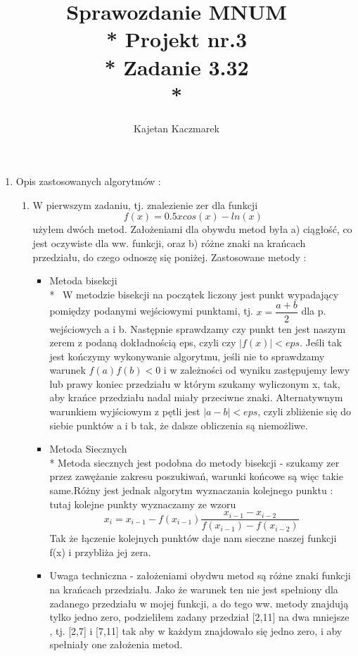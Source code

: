 \documentclass[a4paper, 11pt]{article}
\author{Kajetan Kaczmarek}
\begin{document}
\title{Sprawozdanie MNUM \\* Projekt nr.3 \\* 
Zadanie 3.32 \\*}
\maketitle

\begin{enumerate}

\item Opis zastosowanych algorytmów : 
\begin{enumerate}
\item W pierwszym zadaniu, tj. znalezienie zer dla funkcji \[f(x) = 0.5xcos(x) - ln(x) \] użyłem dwóch metod. Założeniami dla obywdu metod była a) ciągłość, co jest oczywiste dla ww. funkcji, oraz b) różne znaki na krańcach przedziału, do czego odnoszę się poniżej. Zastosowane metody : \begin{itemize} \, \item Metoda bisekcji \\* \, W metodzie bisekcji na początek liczony jest punkt wypadający pomiędzy podanymi wejściowymi punktami, tj. \( x = \dfrac{a+b}{2}\) dla p. wejściowych a i b. Następnie sprawdzamy czy punkt ten jest naszym zerem z podaną dokładnością eps, czyli czy \( |f(x)| < eps \). Jeśli tak jest kończymy wykonywanie algorytmu, jeśli nie to sprawdzamy warunek \( f(a) f(b) < 0 \) i w zależności od wyniku zastępujemy lewy lub prawy koniec przedziału w którym szukamy wyliczonym x, tak, aby krańce przedziału nadal miały przeciwne znaki. Alternatywnym warunkiem wyjściowym z pętli jest \( |a-b|<eps \), czyli zbliżenie się do siebie punktów a i b tak, że dalsze obliczenia są niemożliwe.
\item Metoda Siecznych \\* Metoda siecznych jest podobna do metody bisekcji - szukamy zer przez zawężanie zakresu poszukiwań, warunki końcowe są więc takie same.Różny jest jednak algorytm wyznaczania kolejnego punktu : tutaj kolejne punkty wyznaczamy ze wzoru \[ x_i = x_{i-1} - f(x_{i-1})\dfrac{x_{i-1} - x_{i-2}}{f(x_{i-1}) - f(x_{i-2})} \]
Tak że łączenie kolejnych punktów daje nam sieczne naszej funkcji f(x) i przybliża jej zera.
\item Uwaga techniczna - założeniami obydwu metod są różne znaki funkcji na krańcach przedziału. Jako że warunek ten nie jest spełniony dla zadanego przedziału w mojej funkcji, a do tego ww. metody znajdują tylko jedno zero, podzieliłem zadany przedział [2,11] na dwa mniejsze , tj. [2,7] i [7,11] tak aby w każdym znajdowało się jedno zero, i aby spełniały one założenia metod.
\end{itemize}
\end{enumerate}


\end{enumerate}
\end{document}
